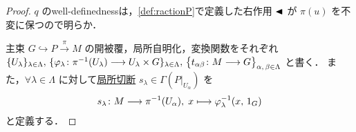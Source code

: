 \documentclass[TQFT_main]{subfiles}
\begin{document}
\begin{proof}
    $q$ のwell-definednessは，\eqref{def:ractionP}で定義した右作用 $\blacktriangleleft$ が $\pi(u)$ を不変に保つので明らか．

    主束 $G \hookrightarrow P \xrightarrow{\pi} M$ の開被覆，局所自明化，変換関数をそれぞれ $\{U_\lambda\}_{\lambda \in \Lambda},\, \{\varphi_\lambda \colon \pi^{-1}(U_\lambda) \longrightarrow U_\lambda \times G\}_{\lambda \in \Lambda},\, \bigl\{ t_{\alpha\beta} \colon M \longrightarrow G \bigr\}_{\alpha,\, \beta \in \Lambda}$ と書く．
    また，$\forall \lambda \in \Lambda$ に対して\hyperref[def.section]{局所切断} $s_\lambda \in \Gamma(P|_{U_\alpha})$ を
    \begin{align}
        s_\lambda \colon M \longrightarrow \pi^{-1}(U_\alpha),\; x \longmapsto \varphi_\lambda^{-1}(x,\, 1_G)
    \end{align}
    と定義する．


\end{proof}
\end{document}
